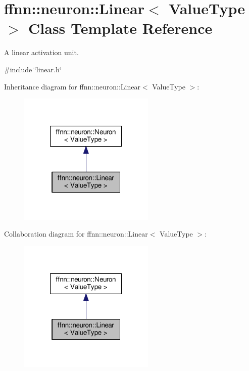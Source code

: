 \hypertarget{classffnn_1_1neuron_1_1_linear}{\section{ffnn\-:\-:neuron\-:\-:Linear$<$ Value\-Type $>$ Class Template Reference}
\label{classffnn_1_1neuron_1_1_linear}
}


A linear activation unit.  




{\ttfamily \#include \char`\"{}linear.\-h\char`\"{}}



Inheritance diagram for ffnn\-:\-:neuron\-:\-:Linear$<$ Value\-Type $>$\-:\nopagebreak
\begin{figure}[H]
\begin{center}
\leavevmode
\includegraphics[width=184pt]{classffnn_1_1neuron_1_1_linear__inherit__graph}
\end{center}
\end{figure}


Collaboration diagram for ffnn\-:\-:neuron\-:\-:Linear$<$ Value\-Type $>$\-:\nopagebreak
\begin{figure}[H]
\begin{center}
\leavevmode
\includegraphics[width=184pt]{classffnn_1_1neuron_1_1_linear__coll__graph}
\end{center}
\end{figure}
